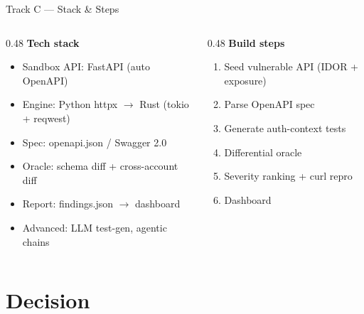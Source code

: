 \documentclass[10pt,aspectratio=169]{beamer}
\begin{document}
\begin{frame}{Track C — Stack \& Steps}
  \begin{columns}[T]
    \begin{column}{0.48\textwidth}
      \textbf{Tech stack}
      \begin{itemize}\small
        \item Sandbox API: FastAPI (auto OpenAPI)
        \item Engine: Python httpx $\to$ Rust (tokio + reqwest)
        \item Spec: openapi.json / Swagger 2.0
        \item Oracle: schema diff + cross-account diff
        \item Report: findings.json $\to$ dashboard
        \item Advanced: LLM test-gen, agentic chains
      \end{itemize}
    \end{column}
    \begin{column}{0.48\textwidth}
      \textbf{Build steps}
      \begin{enumerate}\small
        \item Seed vulnerable API (IDOR + exposure)
        \item Parse OpenAPI spec
        \item Generate auth-context tests
        \item Differential oracle
        \item Severity ranking + curl repro
        \item Dashboard
      \end{enumerate}
    \end{column}
  \end{columns}
\end{frame}

\section{Decision}
\end{document}

